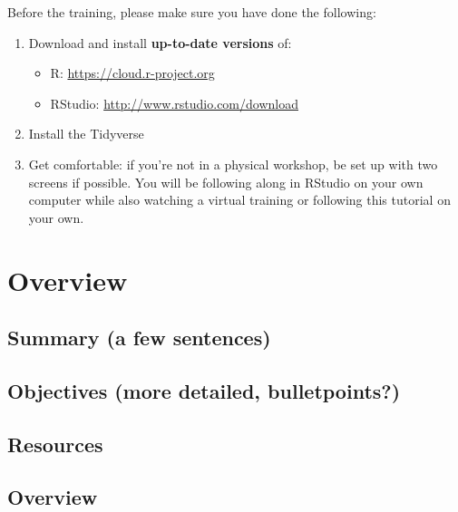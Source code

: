 \documentclass[]{book}
\providecommand{\tightlist}{%
  \setlength{\itemsep}{0pt}\setlength{\parskip}{0pt}}
\begin{document}
Before the training, please make sure you have done the following:

\begin{enumerate}
\def\labelenumi{\arabic{enumi}.}
\tightlist
\item
  Download and install \textbf{up-to-date versions} of:

  \begin{itemize}
  \tightlist
  \item
    R: \url{https://cloud.r-project.org}
  \item
    RStudio: \url{http://www.rstudio.com/download}
  \end{itemize}
\item
  Install the Tidyverse
  \\
\item
  Get comfortable: if you're not in a physical workshop, be set up with two screens if possible. You will be following along in RStudio on your own computer while also watching a virtual training or following this tutorial on your own.
\end{enumerate}

\hypertarget{overview}{%
\chapter{Overview}\label{overview}}

\hypertarget{summary-a-few-sentences}{%
\section{Summary (a few sentences)}\label{summary-a-few-sentences}}

\hypertarget{objectives-more-detailed-bulletpoints}{%
\section{Objectives (more detailed, bulletpoints?)}\label{objectives-more-detailed-bulletpoints}}

\hypertarget{resources}{%
\section{Resources}\label{resources}}

\hypertarget{overview-1}{%
\section{Overview}\label{overview-1}}
\end{document}
